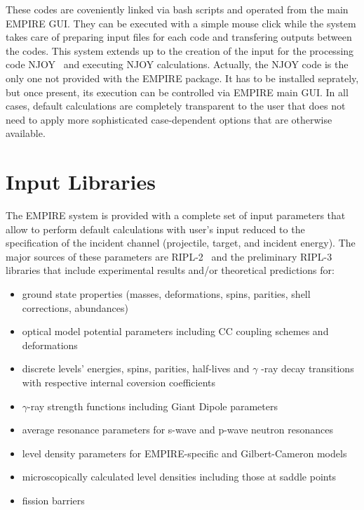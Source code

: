 These codes are coveniently linked via bash scripts and operated from the
main EMPIRE GUI. They can be executed with a simple mouse click while the
system takes care of preparing input files for each code and transfering
outputs between the codes. This system extends up to the creation of the
input for the processing code NJOY~\cite{MacFarlane:94} and executing NJOY calculations.
Actually, the NJOY code is the only one not provided with the EMPIRE package.
It has to be installed seprately, but once present, its execution can be controlled via EMPIRE main GUI. In all cases, default calculations are completely transparent to the user that does not need to apply more sophisticated case-dependent options that are otherwise available.



\section{Input Libraries}

The EMPIRE system is provided with a complete set of input parameters that
allow to perform default calculations with user's input reduced to the
specification of the incident channel (projectile, target, and incident
energy). The major sources of these parameters are RIPL-2~\cite{RIPL2} and
the preliminary RIPL-3 libraries that include experimental results and/or
theoretical predictions for:

\begin{itemize}
\item ground state properties (masses, deformations, spins, parities, shell
corrections, abundances)

\item optical model potential parameters including CC coupling schemes and
deformations

\item discrete levels' energies, spins, parities, half-lives and $\gamma$%
-ray decay transitions with respective internal coversion coefficients

\item $\gamma$-ray strength functions including Giant Dipole parameters

\item average resonance parameters for s-wave and p-wave neutron resonances

\item level density parameters for EMPIRE-specific and Gilbert-Cameron models

\item microscopically calculated level densities including those at saddle
points

\item fission barriers
\end{itemize}

